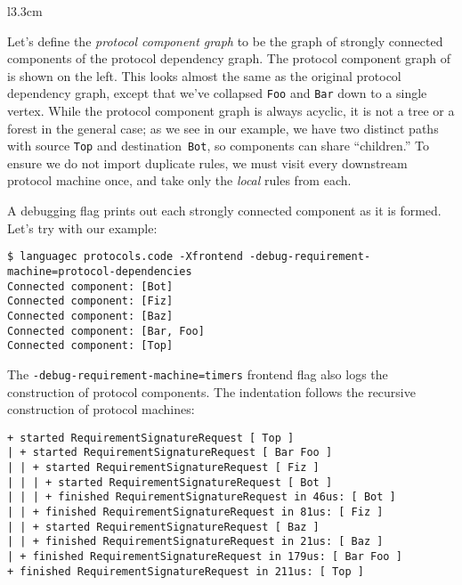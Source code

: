 \documentclass[../generics]{subfiles}
\begin{document}
\begin{wrapfigure}{l}{3.3cm}
\end{wrapfigure}

Let's define the \emph{protocol component graph} to be the graph of strongly connected components of the protocol dependency graph. The protocol component graph of  is shown on the left. This looks almost the same as the original protocol dependency graph, except that we've collapsed \texttt{Foo} and \texttt{Bar} down to a single vertex. While the protocol component graph is always acyclic, it is not a tree or a forest in the general case; as we see in our example, we have two distinct paths with source \texttt{Top} and destination~\texttt{Bot}, so components can share ``children.'' To ensure we do not import duplicate rules, we must visit every downstream protocol machine once, and take only the \emph{local} rules from each.

A debugging flag prints out each strongly connected component as it is formed. Let's try with our example:
\begin{Verbatim}[fontsize=\footnotesize,numbers=none]
$ languagec protocols.code -Xfrontend -debug-requirement-machine=protocol-dependencies
Connected component: [Bot]
Connected component: [Fiz]
Connected component: [Baz]
Connected component: [Bar, Foo]
Connected component: [Top]
\end{Verbatim}

The
\texttt{-debug-requirement-machine=timers} frontend flag also logs the construction of protocol components. The indentation follows the recursive construction of protocol machines:
\begin{Verbatim}[fontsize=\footnotesize,numbers=none]
+ started RequirementSignatureRequest [ Top ]
| + started RequirementSignatureRequest [ Bar Foo ]
| | + started RequirementSignatureRequest [ Fiz ]
| | | + started RequirementSignatureRequest [ Bot ]
| | | + finished RequirementSignatureRequest in 46us: [ Bot ]
| | + finished RequirementSignatureRequest in 81us: [ Fiz ]
| | + started RequirementSignatureRequest [ Baz ]
| | + finished RequirementSignatureRequest in 21us: [ Baz ]
| + finished RequirementSignatureRequest in 179us: [ Bar Foo ]
+ finished RequirementSignatureRequest in 211us: [ Top ]
\end{Verbatim}
\end{document}
